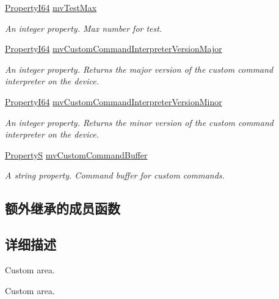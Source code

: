 \begin{DoxyCompactItemize}
\hyperlink{group___common_interface_ga81749b2696755513663492664a18a893}{Property\+I64} \hyperlink{classmv_i_m_p_a_c_t_1_1acquire_1_1_gen_i_cam_1_1mv_custom_data_ae8e8aef64b608eaf89d2dd5c7a931ddd}{mv\+Test\+Max}
\begin{DoxyCompactList}\small\item\em An integer property. Max number for test. \end{DoxyCompactList}\item 
\hyperlink{group___common_interface_ga81749b2696755513663492664a18a893}{Property\+I64} \hyperlink{classmv_i_m_p_a_c_t_1_1acquire_1_1_gen_i_cam_1_1mv_custom_data_ac33f5d2305e6897f9fdaa30cad752b80}{mv\+Custom\+Command\+Interpreter\+Version\+Major}
\begin{DoxyCompactList}\small\item\em An integer property. Returns the major version of the custom command interpreter on the device. \end{DoxyCompactList}\item 
\hyperlink{group___common_interface_ga81749b2696755513663492664a18a893}{Property\+I64} \hyperlink{classmv_i_m_p_a_c_t_1_1acquire_1_1_gen_i_cam_1_1mv_custom_data_ad355488a2d26cd855940418a24a2b790}{mv\+Custom\+Command\+Interpreter\+Version\+Minor}
\begin{DoxyCompactList}\small\item\em An integer property. Returns the minor version of the custom command interpreter on the device. \end{DoxyCompactList}\item 
\hyperlink{classmv_i_m_p_a_c_t_1_1acquire_1_1_property_s}{Property\+S} \hyperlink{classmv_i_m_p_a_c_t_1_1acquire_1_1_gen_i_cam_1_1mv_custom_data_a9cff7474eda237a796fb506f10ba775b}{mv\+Custom\+Command\+Buffer}
\begin{DoxyCompactList}\small\item\em A string property. Command buffer for custom commands. \end{DoxyCompactList}\end{DoxyCompactItemize}
\subsection*{额外继承的成员函数}


\subsection{详细描述}
Custom area. 

Custom area. 

